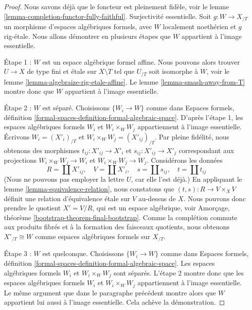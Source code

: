 \begin{proof}
Nous savons déjà que le foncteur est pleinement fidèle, voir le
lemme \ref{lemma-completion-functor-fully-faithful}.
Surjectivité essentielle. Soit $g : W \to X_{/T}$ un morphisme
d'espaces algébriques formels, avec $W$ localement noethérien
et $g$ rig-étale. Nous allons démontrer en plusieurs étapes que $W$
appartient à l'image essentielle.

\medskip\noindent
Étape 1 : $W$ est un espace algébrique formel affine. Nous pouvons alors
trouver $U \to X$ de type fini et étale sur $X \setminus T$ tel que
$U_{/T}$ soit isomorphe à $W$, voir le
lemme \ref{lemma-algebraize-rig-etale-affine}.
Le lemme \ref{lemma-smash-away-from-T} montre donc que $W$
appartient à l'image essentielle.

\medskip\noindent
Étape 2 : $W$ est séparé. Choisissons $\{W_i \to W\}$ comme dans
Espaces formels, définition \ref{formal-spaces-definition-formal-algebraic-space}.
D'après l'étape 1, les espaces algébriques formels $W_i$ et
$W_i \times_W W_j$ appartiennent à l'image essentielle.
Écrivons $W_i = (X'_i)_{/T}$ et $W_i \times_W W_j = (X'_{ij})_{/T}$.
Par pleine fidélité, nous obtenons des morphismes
$t_{ij} : X'_{ij} \to X'_i$ et $s_{ij} : X'_{ij} \to X'_j$ correspondant
aux projections $W_i \times_W W_j \to W_i$ et $W_i \times_W W_j \to W_j$.
Considérons les données
$$
R = \coprod X'_{ij},\quad
V = \coprod X'_i,\quad
s = \coprod s_{ij},\quad
t = \coprod t_{ij}
$$
(Nous ne pouvons pas employer la lettre $U$, car elle l'est déjà.)
En appliquant le lemme \ref{lemma-equivalence-relation}, nous constatons que
$(t, s) : R \to V \times_X V$ définit une relation d'équivalence étale
sur $V$ au-dessus de $X$. Nous pouvons donc prendre le quotient
$X' = V/R$, qui est un espace algébrique, voir
Amorçage, théorème \ref{bootstrap-theorem-final-bootstrap}.
Comme la complétion commute aux produits fibrés et à la formation des
faisceaux quotients, nous obtenons
$X'_{/T} \cong W$ comme espaces algébriques formels sur $X_{/T}$.

\medskip\noindent
Étape 3 : $W$ est quelconque. Choisissons $\{W_i \to W\}$ comme dans
Espaces formels, définition \ref{formal-spaces-definition-formal-algebraic-space}.
Les espaces algébriques formels $W_i$ et $W_i \times_W W_j$ sont séparés.
L'étape 2 montre donc que les espaces algébriques formels $W_i$ et
$W_i \times_W W_j$ appartiennent à l'image essentielle. Le même argument
que dans le paragraphe précédent montre alors que $W$ appartient lui aussi
à l'image essentielle. Cela achève la démonstration.
\end{proof}

